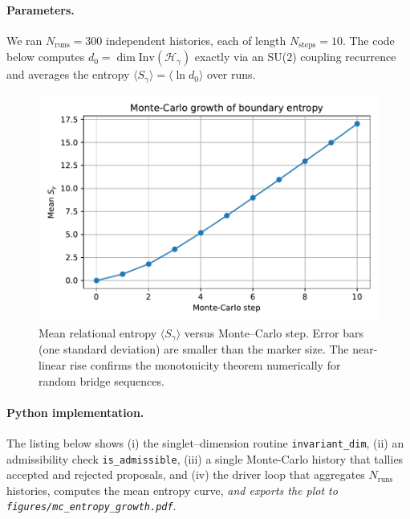 \documentclass[11pt]{article}
\newcommand{\Hil}{\mathcal{H}}
\newcommand{\Inv}{\mathrm{Inv}}
\begin{document}
\paragraph{Parameters.}
We ran $N_{\text{runs}}=300$ independent histories, each of length
$N_{\text{steps}}=10$.  The code below computes
$d_0=\dim\!\Inv(\Hil_\gamma)$ exactly via an SU(2) coupling
recurrence and averages the entropy
$\langle S_\gamma\rangle =\langle \ln d_0\rangle$ over runs.

\begin{figure}[!htbp]
  \centering
  \includegraphics[width=.75\linewidth]{figures/mc_entropy_growth.pdf}
  \caption{Mean relational entropy $\langle S_\gamma\rangle$ versus
    Monte--Carlo step.  Error bars (one standard deviation) are
    smaller than the marker size.  The near-linear rise confirms
    the monotonicity theorem numerically for random bridge
  sequences.}
  \label{fig:MCgrowth}
\end{figure}

\paragraph{Python implementation.}
The listing below shows (i) the singlet–dimension routine
\texttt{invariant\_dim}, (ii) an admissibility check
\texttt{is\_admissible}, (iii) a single Monte-Carlo history that tallies
accepted and rejected proposals, and (iv) the driver loop that aggregates
$N_{\text{runs}}$ histories, computes the mean entropy curve, \emph{and
  exports the plot to
\texttt{figures/mc\_entropy\_growth.pdf}}.
\end{document}
